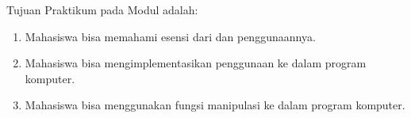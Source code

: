 \documentclass{subfiles}
\begin{document}
    \noindent Tujuan Praktikum pada Modul {} {\leftmark} adalah:
    \begin{enumerate}
        \item Mahasiswa bisa memahami esensi dari {\sarray} dan penggunaannya.
        \item Mahasiswa bisa mengimplementasikan penggunaan {\sarray} ke dalam program komputer.
        \item Mahasiswa bisa menggunakan fungsi manipulasi {\sstring} ke dalam program komputer. 
    \end{enumerate}
\end{document}
